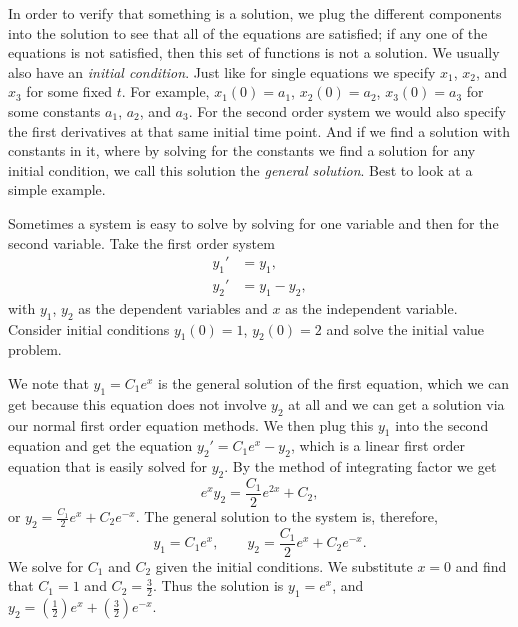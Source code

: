 \documentclass{ximera}
\begin{document}
In order to verify that something is a solution, we plug the different components into the solution to see that all of the equations are satisfied; if any one of the equations is not satisfied, then this set of functions is not a solution. We usually also have an \emph{initial condition}.  Just like for single equations we specify $x_1$, $x_2$, and $x_3$ for some fixed $t$. For example, $x_1(0) = a_1$, $x_2(0) = a_2$, $x_3(0) = a_3$ for some constants $a_1$, $a_2$, and $a_3$.  For the second order system we would also specify the first derivatives at that same initial time point. And if we find a solution with constants in it, where by solving for the constants we find a solution for any initial condition, we call this solution the \emph{general solution}. Best to look at a simple example.

\begin{example}
    Sometimes a system is easy to solve by solving for one variable and then for the second variable. Take the first order system 
    \begin{align*}
        y_1' & = y_1 , \\
        y_2' & = y_1 - y_2 ,
    \end{align*}
    with $y_1$, $y_2$ as the dependent variables and $x$ as the independent variable.  Consider initial conditions $y_1(0) = 1$, $y_2(0) = 2$ and solve the initial value problem. 
\end{example}

\begin{exampleSol}
    We note that $y_1 = C_1 e^x$ is the general solution of the first equation, which we can get because this equation does not involve $y_2$ at all and we can get a solution via our normal first order equation methods. We then plug this $y_1$ into the second equation and get the equation $y_2' = C_1e^x - y_2$, which is a linear first order equation that is easily solved for $y_2$.  By the method of integrating factor we get 
    \begin{equation*}
        e^x y_2 = \frac{C_1}{2}e^{2x} + C_2 ,
    \end{equation*}
    or $y_2 = \frac{C_1}{2}e^{x} + C_2e^{-x}$.  The general solution to the system is, therefore,
    \begin{equation*}
        y_1 = C_1 e^x , \qquad y_2 = \frac{C_1}{2}e^{x} + C_2e^{-x} .
    \end{equation*}
    We solve for $C_1$ and $C_2$ given the initial conditions. We substitute $x=0$ and find that $C_1=1$ and $C_2=\frac{3}{2}$.  Thus the solution is $y_1 = e^x$, and $y_2 = (\frac{1}{2}) e^x + (\frac{3}{2}) e^{-x}$.
\end{exampleSol}
\end{document}
